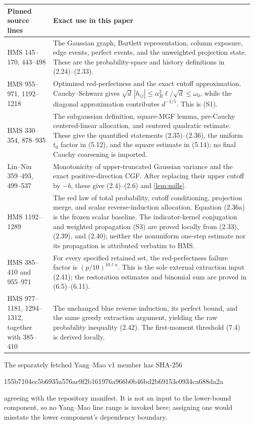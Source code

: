 \begin{longtable}{@{}p{}p{}@{}}
\toprule
Pinned source lines & Exact use in this paper\\
\midrule
\endhead
HMS 145--170, 443--498&
The Gaussian graph, Bartlett representation, column exposure, edge events,
perfect events, and the unweighted projection state.  These are the
probability-space and history definitions in (2.24)--(2.33).\\
HMS 955--971, 1192--1218&
Optimized red-perfectness and the exact cutoff approximation.  Cauchy--Schwarz gives
\(\sqrt d\,|h_{ij}|\le\alpha_R^2\ell/\sqrt d\le\omega_0\), while the
diagonal approximation contributes \(d^{-1/5}\).  This is (S1).\\
HMS 330--354, 878--935&
The subgaussian definition, square-MGF lemma, pre-Cauchy centered-linear
allocation, and centered quadratic estimate.  These give the quantified
statements (2.35)--(2.36), the uniform \(t_0\) factor in (5.12), and the
square estimate in (5.14); no final Cauchy coarsening is imported.\\
Lin--Niu 359--493, 499--537&
Monotonicity of upper-truncated Gaussian variance and the exact
positive-direction CGF\@.  After replacing their upper cutoff by \(-b\),
these give (2.4)--(2.6) and \cref{lem:mills}.\\
HMS 1192--1289&
The red law of total probability, cutoff conditioning, projection merge, and
scalar reverse-induction allocation.  Equation (2.36a) is the frozen scalar
baseline.  The indicator-kernel conjugation and weighted propagation (S3) are
proved locally from (2.33), (2.39), and (2.40); neither the nonuniform
one-step estimate nor its propagation is attributed verbatim to HMS.\\
HMS 385--410 and 955--971&
For every specified retained set, the red-perfectness failure factor is
\((p/10)^{10\ell u}\).  This is the sole external extraction input (2.41);
the restoration estimates and binomial sum are proved in (6.5)--(6.11).\\
HMS 977--1181, 1294--1312, together with 385--410&
The unchanged blue reverse induction, its perfect bound, and the same greedy
extraction argument, yielding the raw probability inequality (2.42).  The
first-moment threshold (7.4) is derived locally.\\
\bottomrule
\end{longtable}

The separately fetched Yang--Mao v1 member has SHA-256
\begin{center}
\small\ttfamily
155b7104ec5b6935a576ae9f2b161976a966b0b46bd2b69153c0934ca688da2a
\end{center}
agreeing with the repository manifest.  It is not an input to the lower-bound
component, so no Yang--Mao line range is invoked here; assigning one would
misstate the lower component's dependency boundary.

